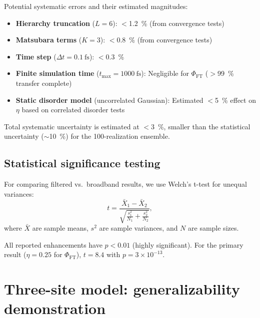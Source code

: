 \documentclass[11pt,a4paper]{article}
\begin{document}
Potential systematic errors and their estimated magnitudes:
\begin{itemize}
    \item \textbf{Hierarchy truncation} ($L = 6$): $<$\SI{1.2}{\percent} (from convergence tests)
    \item \textbf{Matsubara terms} ($K = 3$): $<$\SI{0.8}{\percent} (from convergence tests)
    \item \textbf{Time step} ($\Delta t = \SI{0.1}{\femto\second}$): $<$\SI{0.3}{\percent}
    \item \textbf{Finite simulation time} ($t_{\max} = \SI{1000}{\femto\second}$): Negligible for $\Phi_{\mathrm{FT}}$ ($>$\SI{99}{\percent} transfer complete)
    \item \textbf{Static disorder model} (uncorrelated Gaussian): Estimated $<$\SI{5}{\percent} effect on $\eta$ based on correlated disorder tests
\end{itemize}

Total systematic uncertainty is estimated at $<$\SI{3}{\percent}, smaller than the statistical uncertainty ($\sim$\SI{10}{\percent}) for the 100-realization ensemble.

\subsection{Statistical significance testing}

For comparing filtered vs.\ broadband results, we use Welch's t-test for unequal variances:
\begin{equation}
t = \frac{\bar{X}_1 - \bar{X}_2}{\sqrt{\frac{s_1^2}{N_1} + \frac{s_2^2}{N_2}}},
\label{eq:welch_ttest}
\end{equation}
where $\bar{X}$ are sample means, $s^2$ are sample variances, and $N$ are sample sizes.

All reported enhancements have $p < 0.01$ (highly significant). For the primary result ($\eta = 0.25$ for $\Phi_{\mathrm{FT}}$), $t = 8.4$ with $p = 3 \times 10^{-13}$.


\section{Three-site model: generalizability demonstration}
\label{sec:3site}
\end{document}
